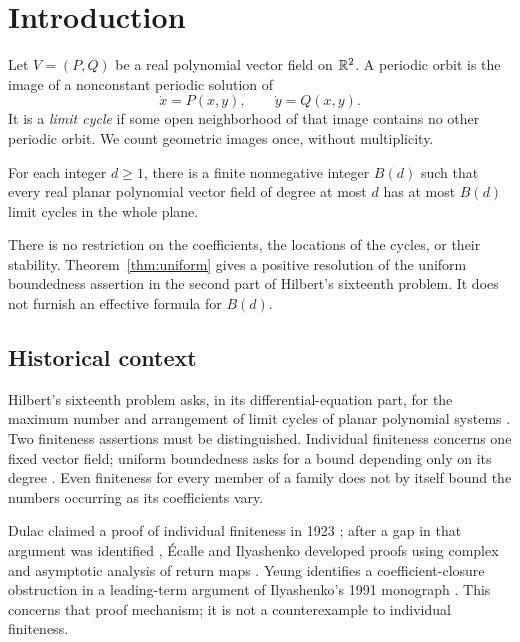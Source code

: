 \section{Introduction}\label{sec:introduction}

Let \(V=(P,Q)\) be a real polynomial vector field on \(\mathbb{R}^2\).
A periodic orbit is the image of a nonconstant periodic solution of
\[
 \dot x=P(x,y),\qquad \dot y=Q(x,y).
\]
It is a \emph{limit cycle} if some open neighborhood of that image contains
no other periodic orbit. We count geometric images once, without
multiplicity.

\begin{theorem}\label{thm:uniform}
For each integer \(d\geq1\), there is a finite nonnegative integer \(B(d)\)
such that every real planar polynomial vector field of degree at most \(d\)
has at most \(B(d)\) limit cycles in the whole plane.
\end{theorem}

There is no restriction on the coefficients, the locations of the cycles,
or their stability. Theorem~\ref{thm:uniform} gives a positive resolution of
the uniform boundedness assertion in the second part of Hilbert's
sixteenth problem. It does not furnish an effective formula for \(B(d)\).

\subsection{Historical context}

Hilbert's sixteenth problem asks, in its differential-equation part, for
the maximum number and arrangement of limit cycles of planar polynomial
systems \citep[Problem~16, p.~465]{Hilbert1902}. Two finiteness assertions
must be distinguished. Individual finiteness concerns one fixed vector
field; uniform boundedness asks for a bound depending only on its degree
\citep[pp.~301--304]{Ilyashenko2002}. Even finiteness for every member of a
family does not by itself bound the numbers occurring as its coefficients
vary.

Dulac claimed a proof of individual finiteness in 1923
\citep{Dulac1923}; after a gap in that argument was identified
\citep{Ilyashenko1985}, \'Ecalle and Ilyashenko developed proofs using
complex and asymptotic analysis of return maps
\citep{Ilyashenko1990,Ilyashenko1991,Ecalle1992}. Yeung identifies a
coefficient-closure obstruction in a leading-term argument of
Ilyashenko's 1991 monograph \citep{Yeung2025}. This concerns that proof
mechanism; it is not a counterexample to individual finiteness.

